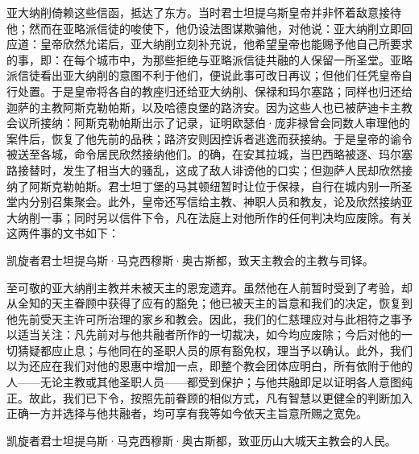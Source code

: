 亚大纳削倚赖这些信函，抵达了东方。当时君士坦提乌斯皇帝并非怀着敌意接待他；然而在亚略派信徒的唆使下，他仍设法图谋欺骗他，对他说：亚大纳削立即回应道：皇帝欣然允诺后，亚大纳削立刻补充说，他希望皇帝也能赐予他自己所要求的事，即：在每个城市中，为那些拒绝与亚略派信徒共融的人保留一所圣堂。亚略派信徒看出亚大纳削的意图不利于他们，便说此事可改日再议；但他们任凭皇帝自行处置。于是皇帝将各自的教座归还给亚大纳削、保禄和玛尔塞路；同样也归还给迦萨的主教阿斯克勒帕斯，以及哈德良堡的路济安。因为这些人也已被萨迪卡主教会议所接纳：阿斯克勒帕斯出示了记录，证明欧瑟伯·庞非禄曾会同数人审理他的案件后，恢复了他先前的品秩；路济安则因控诉者逃逸而获接纳。于是皇帝的谕令被送至各城，命令居民欣然接纳他们。的确，在安其拉城，当巴西略被逐、玛尔塞路接替时，发生了相当大的骚乱，这成了敌人诽谤他的口实；但迦萨人民却欣然接纳了阿斯克勒帕斯。君士坦丁堡的马其顿纽暂时让位于保禄，自行在城内别一所圣堂内分别召集聚会。此外，皇帝还写信给主教、神职人员和教友，论及欣然接纳亚大纳削一事；同时另以信件下令，凡在法庭上对他所作的任何判决均应废除。有关这两件事的文书如下：\par

\par

凯旋者君士坦提乌斯·马克西穆斯·奥古斯都，致天主教会的主教与司铎。\par

至可敬的亚大纳削主教并未被天主的恩宠遗弃。虽然他在人前暂时受到了考验，却从全知的天主眷顾中获得了应有的豁免；他已被天主的旨意和我们的决定，恢复到他先前受天主许可所治理的家乡和教会。因此，我们的仁慈理应对与此相符之事予以适当关注：凡先前对与他共融者所作的一切裁决，如今均应废除；今后对他的一切猜疑都应止息；与他同在的圣职人员的原有豁免权，理当予以确认。此外，我们以为还应在我们对他的恩惠中增加一点，即整个教会团体应明白，所有依附于他的人——无论主教或其他圣职人员——都受到保护；与他共融即足以证明各人意图纯正。故此，我们已下令，按照先前眷顾的相似方式，凡有智慧以更健全的判断加入正确一方并选择与他共融者，均可享有我等如今依天主旨意所赐之宽免。\par

\par

凯旋者君士坦提乌斯·马克西穆斯·奥古斯都，致亚历山大城天主教会的人民。\par

